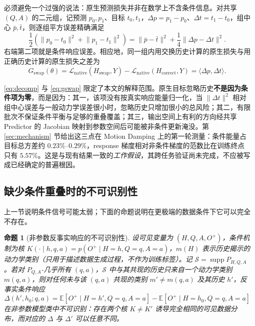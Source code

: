 \documentclass[UTF8,zihao=-4,fontset=fandol]{ctexart}
\newtheorem{proposition}{命题}
\begin{document}
必须避免一个过强的说法：原生预测损失并非在数学上不含条件信息。对共享 $(Q,A)$ 的二元组，记预测 $p_0,p_1$、目标 $t_0,t_1$，$\Delta p=p_1-p_0$、$\Delta t=t_1-t_0$，组中心 $\bar p,\bar t$，则逐组平方误差精确满足
\begin{equation}
  \frac{1}{2}\left(\lVert p_0-t_0\rVert^2+\lVert p_1-t_1\rVert^2\right)
  =\lVert\bar p-\bar t\rVert^2+\frac{1}{4}\lVert\Delta p-\Delta t\rVert^2 .
  \label{eq:decomp}
\end{equation}
右端第二项就是条件响应误差。相应地，同一组内用交换历史计算的原生损失与用正确历史计算的原生损失之差为
\begin{equation}
  G_{\mathrm{swap}}(\theta)
  =\mathcal{L}_{\mathrm{native}}(H_{\mathrm{swap}},Y)-\mathcal{L}_{\mathrm{native}}(H_{\mathrm{correct}},Y)
  =\langle\Delta p,\Delta t\rangle .
  \label{eq:gswap}
\end{equation}

\eqref{eq:decomp} 与 \eqref{eq:gswap} 限定了本文的解释范围。原生目标忽略历史\textbf{不是因为条件项为零}，而是因为：其一，该项没有按真实响应能量归一化，当 $\lVert\Delta t\rVert^2$ 相对组中心误差与一般动力学误差很小时，忽略历史只增加很小的总风险；其二，有限批次不保证条件平衡与足够的重叠覆盖；其三，输出空间上有利的方向经共享 Predictor 的 Jacobian 映射到参数空间后可能被非条件更新淹没。第 \ref{sec:mechanism} 节给出这三点在 Motion Damping 上的第一轮测量：条件能量占目标总方差约 $0.23\%\text{--}0.29\%$，response 梯度相对非条件梯度的范数比在训练终点只有 $5.57\%$。这是与现有结果一致的\emph{工作假设}，其跨任务验证尚未完成，不应被写成已经确定的普遍根因。

\subsection{缺少条件重叠时的不可识别性}

上一节说明条件信号可能太弱；下面的命题说明在更极端的数据条件下它可以完全不存在。

\begin{proposition}[非参数反事实响应的不可识别性]
\label{prop:ident}
设可见变量为 $(H,Q,A,O^+)$，条件机制为核 $K(\cdot\mid h,q,a)=p(O^+\mid H=h,Q=q,A=a)$，$m(H)$ 表示历史揭示的动力学类别（只用于描述数据生成过程，不作为训练标签）。记 $\mathcal{S}=\operatorname{supp}P_{H,Q,A}$。若对 $P_{Q,A}$-几乎所有 $(q,a)$，$\mathcal{S}$ 中与其共现的历史只来自一个动力学类别 $m(q,a)$，则对任何未与该 $(q,a)$ 共现的类别 $m'\neq m(q,a)$ 及其历史 $h'$，反事实条件响应
\begin{equation}
  \Delta(h',h_0;q,a)=\mathbb{E}[O^+\mid H=h',Q=q,A=a]-\mathbb{E}[O^+\mid H=h_0,Q=q,A=a]
\end{equation}
在非参数模型类中不可识别：存在两个核 $K\neq K'$ 诱导完全相同的可见数据分布，而对应的 $\Delta$ 与 $\Delta'$ 可以任意不同。
\end{proposition}
\end{document}

